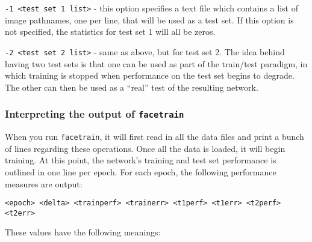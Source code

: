 \begin{description}
\item {\tt -1 <test set 1 list>} - this option specifies a text
file which contains a list of image pathnames, one per line, that
will be used as a test set.  If this option is not specified,
the statistics for test set 1 will all be zeros.

\item {\tt -2 <test set 2 list>} - same as above, but for test set 2.
The idea behind having two test sets is that one can be used as part
of the train/test paradigm, in which training is stopped when performance
on the test set begins to degrade.  The other can then be used as a
``real'' test of the resulting network.

\end{description}

\subsubsection{Interpreting the output of {\tt facetrain}}

When you run {\tt facetrain}, it will first read in
all the data files and print a bunch of lines regarding
these operations. Once all the data is loaded, it will
begin training. At this point, the network's training 
and test set performance is outlined in one line per epoch.
For each epoch, the following 
performance measures are output:

{\tt <epoch> <delta> <trainperf> <trainerr> <t1perf> <t1err>
<t2perf> <t2err>}

These values have the following meanings:

